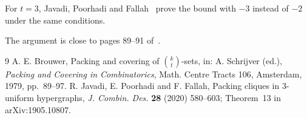\documentclass[11pt,a4paper]{article}
\begin{document}
For $t=3$, Javadi, Poorhadi and Fallah~\cite{JPF} prove the bound with $-3$
instead of $-2$ under the same conditions.

The argument is close to pages 89--91 of~\cite{B79}.

\begin{thebibliography}{9}\small
{} A. E. Brouwer, Packing and covering of $\binom{k}{t}$-sets,
in: A. Schrijver (ed.), \emph{Packing and Covering in Combinatorics},
Math. Centre Tracts 106, Amsterdam, 1979, pp.~89--97.
 R. Javadi, E. Poorhadi and F. Fallah, Packing cliques in
$3$-uniform hypergraphs, \emph{J. Combin. Des.} \textbf{28} (2020) 580--603;
Theorem~13 in arXiv:1905.10807.
\end{thebibliography}
\end{document}
